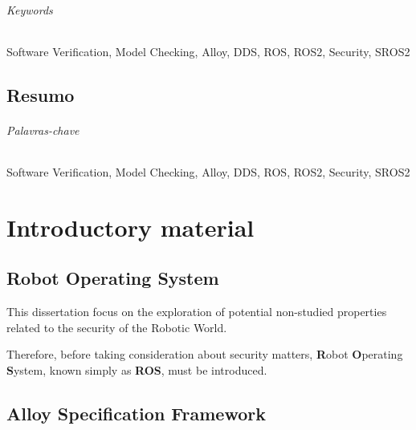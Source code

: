 \documentclass[
  oneside,
  11pt, a4paper,
  footinclude=true,
  headinclude=true,
  cleardoublepage=empty
]{scrbook}
\begin{document}
\paragraph{Keywords} Software Verification, Model Checking, Alloy, DDS, ROS, ROS2, Security, SROS2
	\cleardoublepage

\chapter*{Resumo}
	
	

\paragraph{Palavras-chave} Software Verification, Model Checking, Alloy, DDS, ROS, ROS2, Security, SROS2


	\cleardoublepage

	\setcounter{page}{3}

	\cleardoublepage
	\tableofcontents

	\cleardoublepage
	\listoffigures



	\cleardoublepage
	\setcounter{page}{3}

\part{Introductory material}



\chapter{Robot Operating System}\label{c:intro-ros}

	This dissertation focus on the exploration of potential non-studied properties related to the security of the Robotic World.
	
	Therefore, before taking consideration about security matters, \textbf{R}obot \textbf{O}perating \textbf{S}ystem, known simply as \textbf{ROS}, must be introduced. 

	


\chapter{Alloy Specification Framework}\label{c:intro-alloy}
\end{document}
